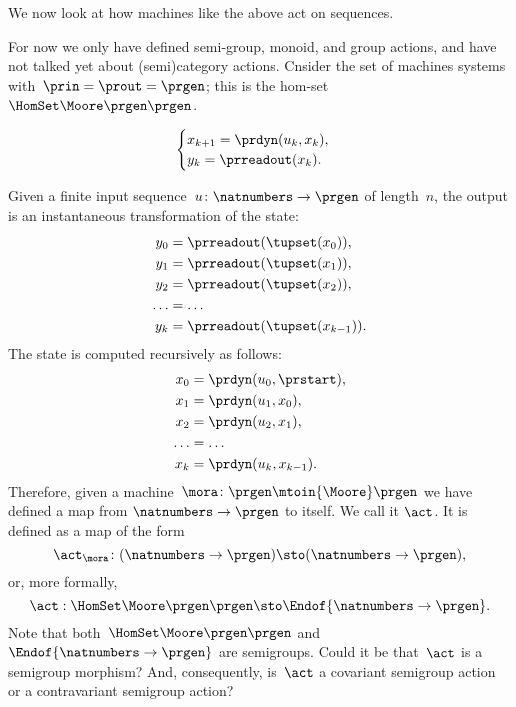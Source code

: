 We now look at how machines like the above act on sequences.

For now we only have defined semi-group, monoid, and group actions, and have not talked yet about (semi)category actions.
Cnsider the set of machines systems with~$\prin = \prout = \prgen$; this is the hom-set~$\HomSet\Moore\prgen\prgen$.


\begin{equation}
    \begin{cases}
        x_{k+1} = \prdyn(u_k, x_k), \\
        y_{k}   = \prreadout(x_{k}).
    \end{cases}
\end{equation}


Given a finite input sequence~$u\colon \natnumbers \to \prgen$ of length~$n$, the output is an instantaneous transformation of the state:
%
\begin{equation}
    \label{eq:actions-on-sequences-y}
    \begin{aligned}
        y_0   & = \prreadout(\tupset(x_0)), \\
        y_1   & = \prreadout(\tupset(x_1)), \\
        y_2   & = \prreadout(\tupset(x_2)), \\
        \dots & = \dots \\
        y_{k} & = \prreadout(\tupset(x_{k-1})).
    \end{aligned}
\end{equation}
%
The state is computed recursively as follows:
\begin{equation}
    \label{eq:actions-on-sequences-x}
    \begin{aligned}
        x_0   & = \prdyn(u_0, \prstart), \\
        x_1   & = \prdyn(u_1, x_0), \\
        x_2   & = \prdyn(u_2, x_1), \\
        \dots & = \dots \\
        x_{k} & = \prdyn(u_{k}, x_{k-1}).
    \end{aligned}
\end{equation}
%
Therefore, given a machine~$\mora \colon \prgen \mtoin{\Moore} \prgen$ we have defined a map from $\natnumbers \to \prgen$ to itself.
We call it $\act$.
It is defined as a map of the form
%
\begin{equation}
    \label{eq:actions-on-sequences-1}
    \act_{\mora}\colon  (\natnumbers \to \prgen)  \sto  (\natnumbers \to \prgen),
\end{equation}
%
or, more formally,
%
\begin{equation}
    \label{eq:actions-on-sequences-2}
    \act: \HomSet\Moore\prgen\prgen \sto \Endof {\natnumbers \to \prgen}.
\end{equation}
%
Note that both~$\HomSet\Moore\prgen\prgen$ and $\Endof {\natnumbers \to \prgen}$ are semigroups.
Could it be that~$\act$ is a semigroup morphism?
And, consequently, is~$\act$ a covariant semigroup action or a contravariant semigroup action?


